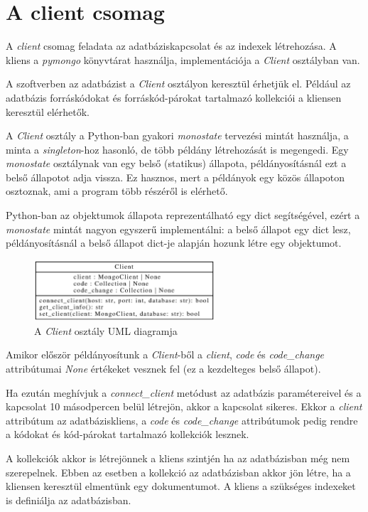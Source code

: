 \section{A client csomag}

A \emph{client} csomag feladata az adatbáziskapcsolat és az indexek létrehozása.
A kliens a \emph{pymongo} könyvtárat használja, implementációja a \emph{Client} osztályban van.

A szoftverben az adatbázist a \emph{Client} osztályon keresztül érhetjük el.
Például az adatbázis forráskódokat és forráskód-párokat tartalmazó kollekciói a kliensen
keresztül elérhetők.

A \emph{Client} osztály a Python-ban gyakori \emph{monostate} \cite{monostatePattern}
tervezési mintát használja, a minta a \emph{singleton}-hoz hasonló,
de több példány létrehozását is megengedi.
Egy \emph{monostate} osztálynak van egy belső (statikus) állapota,
példányosításnál ezt a belső állapotot adja vissza.
Ez hasznos, mert a példányok egy közös állapoton osztoznak, ami a program több részéről is elérhető.

Python-ban az objektumok állapota reprezentálható egy dict segítségével,
ezért a \emph{monostate} mintát nagyon egyszerű implementálni:
a belső állapot egy dict lesz, példányosításnál a belső állapot dict-je alapján hozunk létre egy objektumot.

\begin{figure}[H]
	\centering
	\includegraphics[width=0.6\textwidth]{images/uml/Client.eps}
	\caption{A \emph{Client} osztály UML diagramja}
\end{figure}

Amikor először példányosítunk a \emph{Client}-ből a \emph{client}, \emph{code} és \emph{code\_change}
attribútumai \emph{None} értékeket vesznek fel (ez a kezdelteges belső állapot).

Ha ezután meghívjuk a \emph{connect\_client} metódust az adatbázis paramétereivel
és a kapcsolat 10 másodpercen belül létrejön, akkor a kapcsolat sikeres.
Ekkor
a \emph{client} attribútum az adatbáziskliens,
a \emph{code} és \emph{code\_change} attribútumok pedig rendre
a kódokat és kód-párokat tartalmazó kollekciók lesznek.

A kollekciók akkor is létrejönnek a kliens szintjén ha az adatbázisban még nem szerepelnek.
Ebben az esetben a kollekció az adatbázisban akkor jön létre, ha a kliensen keresztül elmentünk egy dokumentumot.
A kliens a szükséges indexeket is definiálja az adatbázisban.

